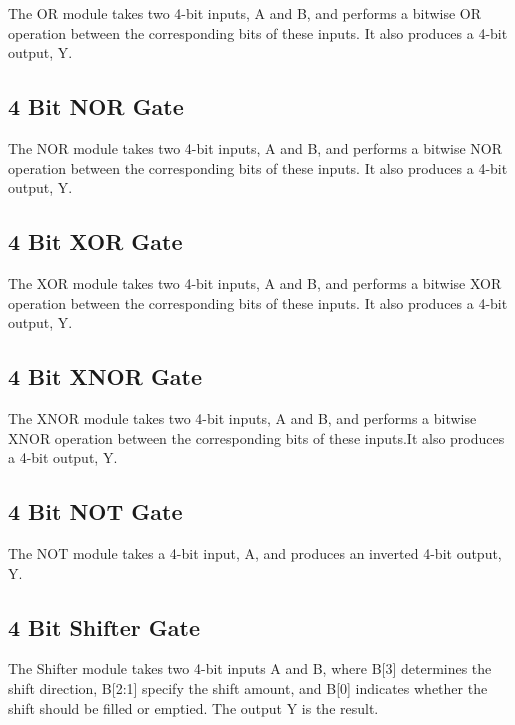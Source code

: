 \documentclass[12pt]{article}
\begin{document}
The OR module takes two 4-bit inputs, A and B, and performs a bitwise OR operation between the corresponding bits of these inputs. It also produces a 4-bit output, Y.


\subsection{4 Bit NOR Gate}

The NOR module takes two 4-bit inputs, A and B, and performs a bitwise NOR operation between the corresponding bits of these inputs. It also produces a 4-bit output, Y.


\subsection{4 Bit XOR Gate}

The XOR module takes two 4-bit inputs, A and B, and performs a bitwise XOR operation between the corresponding bits of these inputs. It also produces a 4-bit output, Y.


\subsection{4 Bit XNOR Gate}

The XNOR module takes two 4-bit inputs, A and B, and performs a bitwise XNOR operation between the corresponding bits of these inputs.It also produces a 4-bit output, Y.


\subsection{4 Bit NOT Gate}

The NOT module takes a 4-bit input, A, and produces an inverted  4-bit output, Y. 


\subsection{4 Bit Shifter Gate}

The Shifter module takes two 4-bit inputs A and B, where B[3] determines the shift direction, B[2:1] specify the shift amount, and B[0] indicates whether the shift should be filled or emptied. The output Y is the result.
\end{document}
